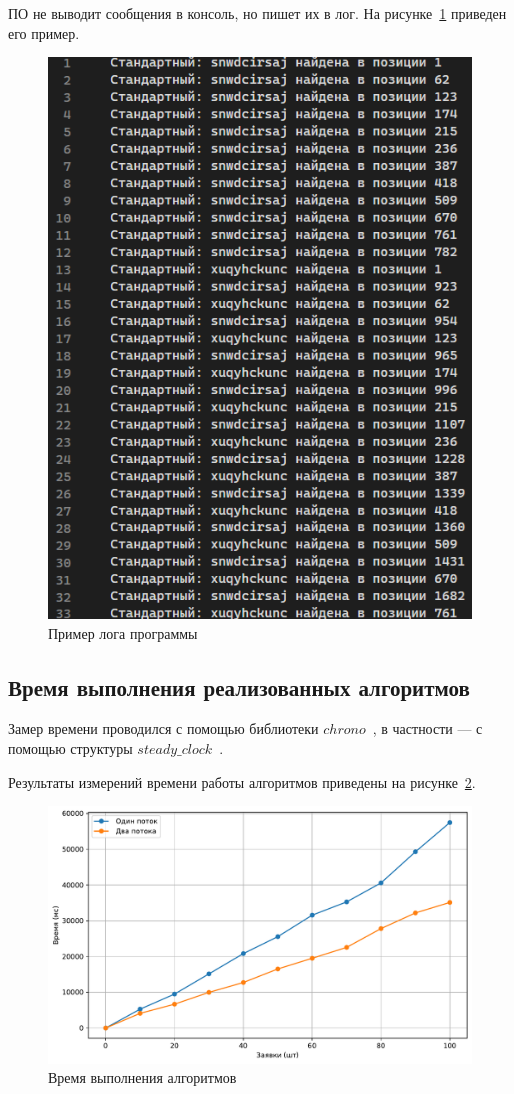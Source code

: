 ПО не выводит сообщения в консоль, но пишет их в лог.
На рисунке~\ref{fig:log_png} приведен его пример.
\begin{figure}
	\centering
	\includegraphics[width=0.7\linewidth]{images/log.png}
	\caption{Пример лога программы}
	\label{fig:log_png}
\end{figure}


\newpage

\subsection{Время выполнения реализованных алгоритмов}
Замер времени проводился с помощью библиотеки $chrono$~\cite{chrono}, в частности --- с помощью структуры $steady\_clock$~\cite{steady}.

Результаты измерений времени работы алгоритмов приведены на рисунке~\ref{fig:results}.
\begin{figure}
	\centering
	\includegraphics[width=1\linewidth]{../src/rk_01/time}
	\caption{Время выполнения алгоритмов}
	\label{fig:results}
\end{figure}

